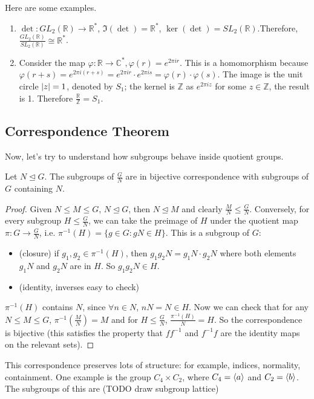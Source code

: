 \documentclass{article}
\begin{document}
Here are some examples.
\begin{enumerate}
	\item $\det : GL_2(\mathbb R) \to \mathbb R^*$, $\Im(\det) = \mathbb R^*$, $\ker(\det) = SL_2(\mathbb R)$.Therefore, $\frac{GL_2(\mathbb R)}{SL_2(\mathbb R)} \cong \mathbb R^*$.
	\item Consider the map $\varphi: \mathbb R \to \mathbb C^*, \varphi(r) = e^{2\pi i r}$. This is a homomorphism because $\varphi(r + s) = e^{2\pi i (r + s)} = e^{2 \pi i r}\cdot e^{2 \pi i s} = \varphi(r) \cdot \varphi(s)$. The image is the unit circle $\abs{z} = 1$, denoted by $S_1$; the kernel is $\mathbb Z$ as $e^{2 \pi i z}$ for some $z \in \mathbb Z$, the result is 1. Therefore $\frac{\mathbb R}{\mathbb Z} = S_1$.
\end{enumerate}

\subsection{Correspondence Theorem}
Now, let's try to understand how subgroups behave inside quotient groups.
\begin{theorem}
	Let $N \trianglelefteq G$. The subgroups of $\frac{G}{N}$ are in bijective correspondence with subgroups of $G$ containing $N$.
\end{theorem}
\begin{proof}
	Given $N \leq M \leq G$, $N \trianglelefteq G$, then $N \trianglelefteq M$ and clearly $\frac{M}{N} \leq \frac{G}{N}$. Conversely, for every subgroup $H \leq \frac{G}{N}$, we can take the preimage of $H$ under the quotient map $\pi : G \to \frac{G}{N}$, i.e. $\pi^{-1}(H) = \{ g \in G : gN \in H \}$. This is a subgroup of $G$:
	\begin{itemize}
		\item (closure) if $g_1, g_2 \in \pi^{-1}(H)$, then $g_1g_2N = g_1N\cdot g_2N$ where both elements $g_1N$ and $g_2N$ are in $H$. So $g_1g_2N \in H$.
		\item (identity, inverses easy to check)
	\end{itemize}
	$\pi^{-1}(H)$ contains $N$, since $\forall n \in N$, $nN = N \in H$. Now we can check that for any $N \leq M \leq G$, $\pi^{-1}(\frac{M}{N}) = M$ and for $H \leq \frac{G}{N}$, $\frac{\pi^{-1}(H)}{N} = H$. So the correspondence is bijective (this satisfies the property that $ff^{-1}$ and $f^{-1}f$ are the identity maps on the relevant sets).
\end{proof}
This correspondence preserves lots of structure: for example, indices, normality, containment. One example is the group $C_4 \times C_2$, where $C_4 = \langle a \rangle$ and $C_2 = \langle b \rangle$. The subgroups of this are (TODO draw subgroup lattice)
\end{document}
